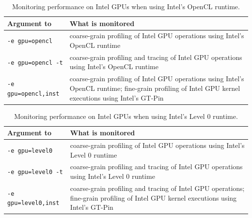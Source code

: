{
\centering
 \vspace{2ex}
}


\begin{table}[t]
\centering
\begin{tabular}{|l|p{3.5in}|}\hline
Argument to \hpcrun{} & What is monitored\\\hline\hline
{\tt -e gpu=opencl} & coarse-grain profiling of Intel GPU operations using Intel's OpenCL runtime\\\hline
{\tt -e gpu=opencl -t} & coarse-grain profiling and tracing of Intel GPU operations using Intel's OpenCL runtime\\\hline
{\tt -e gpu=opencl,inst} & coarse-grain profiling of Intel GPU operations using Intel's OpenCL runtime;  fine-grain profiling of Intel GPU kernel executions using Intel's GT-Pin \\\hline
\end{tabular}
\caption{Monitoring performance on Intel GPUs when using Intel's OpenCL runtime.}
\label{intel-opencl-options}
\end{table}

\begin{table}[t]
\centering
\begin{tabular}{|l|p{3.5in}|}\hline
Argument to \hpcrun{} & What is monitored\\\hline\hline
{\tt -e gpu=level0} & coarse-grain profiling of Intel GPU operations using Intel's Level 0 runtime\\\hline
{\tt -e gpu=level0 -t} & coarse-grain profiling and tracing of Intel GPU operations using Intel's Level 0 runtime\\\hline
{\tt -e gpu=level0,inst} & coarse-grain profiling and tracing of Intel GPU operations;  fine-grain profiling of Intel GPU kernel executions using Intel's GT-Pin\\\hline
\end{tabular}
\caption{Monitoring performance on Intel GPUs when using Intel's Level 0 runtime.}
\label{intel-level0-options}
\end{table}


